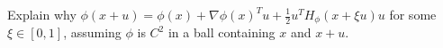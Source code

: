 \documentclass[12pt, leqno]{article}
\begin{document}

Explain why $\phi(x + u) = \phi(x) + \nabla \phi(x)^T u + \frac{1}{2} u^T H_{\phi}(x + \xi u) u$ for some $\xi \in [0, 1]$, assuming $\phi$ is $C^2$ in a ball containing $x$ and $x+u$.
\end{document}
